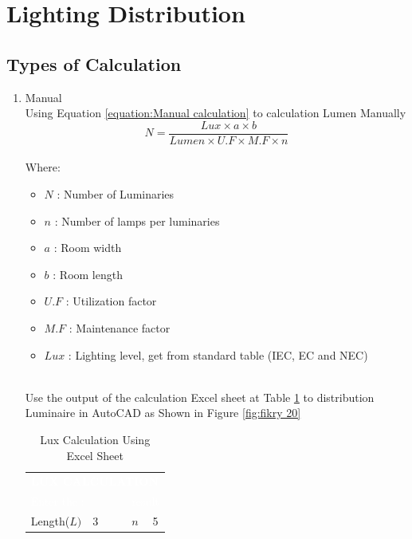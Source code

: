 \documentclass[12pt,fleqn]{book} %
\begin{document}
\section{Lighting Distribution}
\subsection{Types of Calculation}
\begin{enumerate}
    \item Manual
    \\ Using Equation \ref{equation:Manual calculation} to calculation Lumen Manually
    \begin{equation}
        N=\frac{Lux \times a \times b}{Lumen \times U.F \times M.F \times n}
        \label{equation:Manual calculation}
    \end{equation}
    \\ Where:
    \begin{itemize}
        \item $N$ : Number of Luminaries
        \item $n$ : Number of lamps per luminaries
        \item $a$ : Room width
        \item $b$ : Room length
        \item $U.F$ : Utilization factor
        \item $M.F$ : Maintenance factor
        \item $Lux$ : Lighting level, get from standard table (IEC, EC and NEC)
    \end{itemize}
    \\ Use the output of the calculation Excel sheet at Table \ref{tab:Lux Calculation Using Excel sheet}  to distribution Luminaire in AutoCAD as Shown in Figure \ref{fig:fikry 20}
\begin{table}[!h]
\centering
\caption{Lux Calculation Using Excel Sheet}
\label{tab:Lux Calculation Using Excel sheet}
\begin{tabular}{lclllc}
\multicolumn{6}{c}{{\cellcolor[rgb]{0.055,0.337,0.447}}\textcolor{white}{\textbf{LUX CALCULATION}}}                                                                                                                   \\
\multicolumn{2}{l}{{\cellcolor[rgb]{0.078,0.51,0.671}}\textcolor{white}{ Enter the :}} &  &  & \multicolumn{2}{c}{{\cellcolor[rgb]{0.078,0.51,0.671}}\textcolor{white}{result}}                                       \\
{\cellcolor[rgb]{0.467,0.804,0.933}}Length($L)$      & 3                               &  &  & {\cellcolor[rgb]{0.467,0.804,0.933}}$n$                                                & 5                             \\

\end{tabular}
\end{table}
\end{enumerate}
\end{document}
